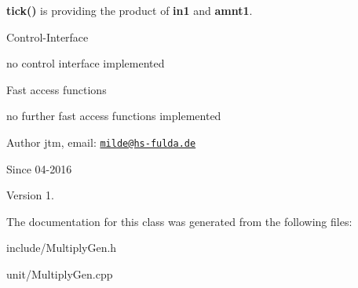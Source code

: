 \begin{DoxyItemize}
\item {\bfseries tick()} is providing the product of {\bfseries in1} and {\bfseries amnt1}.
\end{DoxyItemize}

Control-\/\-Interface
\begin{DoxyItemize}
\item no control interface implemented
\end{DoxyItemize}

Fast access functions
\begin{DoxyItemize}
\item no further fast access functions implemented
\end{DoxyItemize}

\begin{DoxyAuthor}{Author}
jtm, email\-:  \href{mailto:milde@hs-fulda.de}{\tt milde@hs-\/fulda.\-de} 
\end{DoxyAuthor}
\begin{DoxySince}{Since}
04-\/2016 
\end{DoxySince}
\begin{DoxyVersion}{Version}
1. 
\end{DoxyVersion}


The documentation for this class was generated from the following files\-:\begin{DoxyCompactItemize}
\item 
include/Multiply\-Gen.\-h\item 
unit/Multiply\-Gen.\-cpp\end{DoxyCompactItemize}
